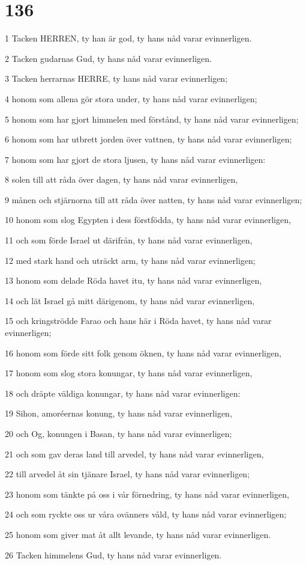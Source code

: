 \chapter{136}

\par 1 Tacken HERREN, ty han är god, ty hans nåd varar evinnerligen.
\par 2 Tacken gudarnas Gud, ty hans nåd varar evinnerligen.
\par 3 Tacken herrarnas HERRE, ty hans nåd varar evinnerligen;
\par 4 honom som allena gör stora under, ty hans nåd varar evinnerligen;
\par 5 honom som har gjort himmelen med förstånd, ty hans nåd varar evinnerligen;
\par 6 honom som har utbrett jorden över vattnen, ty hans nåd varar evinnerligen;
\par 7 honom som har gjort de stora ljusen, ty hans nåd varar evinnerligen:
\par 8 solen till att råda över dagen, ty hans nåd varar evinnerligen,
\par 9 månen och stjärnorna till att råda över natten, ty hans nåd varar evinnerligen;
\par 10 honom som slog Egypten i dess förstfödda, ty hans nåd varar evinnerligen,
\par 11 och som förde Israel ut därifrån, ty hans nåd varar evinnerligen,
\par 12 med stark hand och uträckt arm, ty hans nåd varar evinnerligen;
\par 13 honom som delade Röda havet itu, ty hans nåd varar evinnerligen,
\par 14 och lät Israel gå mitt därigenom, ty hans nåd varar evinnerligen,
\par 15 och kringströdde Farao och hans här i Röda havet, ty hans nåd varar evinnerligen;
\par 16 honom som förde sitt folk genom öknen, ty hans nåd varar evinnerligen,
\par 17 honom som slog stora konungar, ty hans nåd varar evinnerligen,
\par 18 och dräpte väldiga konungar, ty hans nåd varar evinnerligen:
\par 19 Sihon, amoréernas konung, ty hans nåd varar evinnerligen,
\par 20 och Og, konungen i Basan, ty hans nåd varar evinnerligen;
\par 21 och som gav deras land till arvedel, ty hans nåd varar evinnerligen,
\par 22 till arvedel åt sin tjänare Israel, ty hans nåd varar evinnerligen;
\par 23 honom som tänkte på oss i vår förnedring, ty hans nåd varar evinnerligen,
\par 24 och som ryckte oss ur våra ovänners våld, ty hans nåd varar evinnerligen;
\par 25 honom som giver mat åt allt levande, ty hans nåd varar evinnerligen.
\par 26 Tacken himmelens Gud, ty hans nåd varar evinnerligen.


